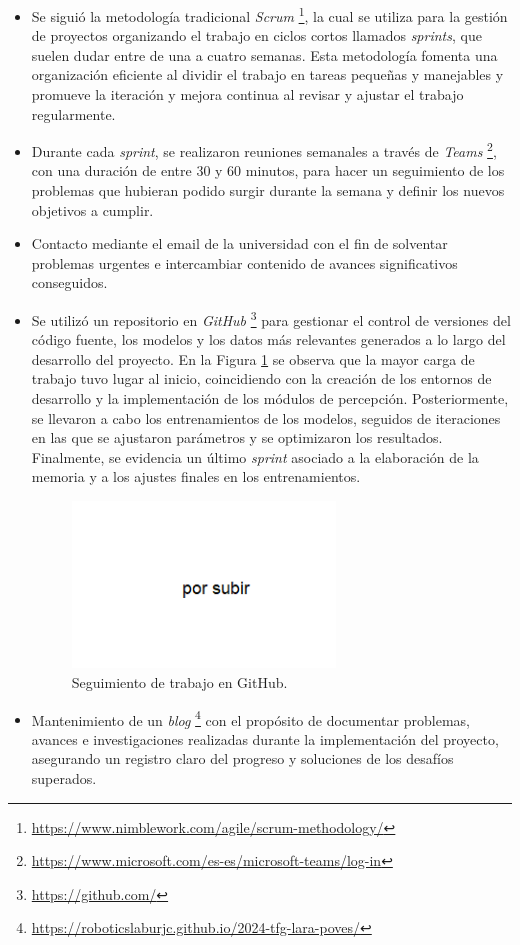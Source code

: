 \begin{itemize}
\item Se siguió la metodología tradicional \textit{Scrum} \footnote{\url{https://www.nimblework.com/agile/scrum-methodology/}}, la cual se utiliza para la gestión de proyectos organizando el trabajo en ciclos cortos llamados \textit{sprints}, que suelen dudar entre de una a cuatro semanas. Esta metodología fomenta una organización eficiente al dividir el trabajo en tareas pequeñas y manejables y promueve la iteración y mejora continua al revisar y ajustar el trabajo regularmente.
\item Durante cada \textit{sprint}, se realizaron reuniones semanales a través de \textit{Teams} \footnote{\url{https://www.microsoft.com/es-es/microsoft-teams/log-in}}, con una duración de entre 30 y 60 minutos, para hacer un seguimiento de los problemas que hubieran podido surgir durante la semana y definir los nuevos objetivos a cumplir.
\item Contacto mediante el email de la universidad con el fin de solventar problemas urgentes e intercambiar contenido de avances significativos conseguidos.
\item Se utilizó un repositorio en \textit{GitHub} \footnote{\url{https://github.com/}} para gestionar el control de versiones del código fuente, los modelos y los datos más relevantes generados a lo largo del desarrollo del proyecto. En la Figura \ref{fig:github} se observa que la mayor carga de trabajo tuvo lugar al inicio, coincidiendo con la creación de los entornos de desarrollo y la implementación de los módulos de percepción. Posteriormente, se llevaron a cabo los entrenamientos de los modelos, seguidos de iteraciones en las que se ajustaron parámetros y se optimizaron los resultados. Finalmente, se evidencia un último \textit{sprint} asociado a la elaboración de la memoria y a los ajustes finales en los entrenamientos.

\begin{figure}[ht]
  \centering
  \includegraphics[width=7cm]{figs/objetivos/github.png}
  \caption{Seguimiento de trabajo en GitHub.}
  \label{fig:github}
\end{figure}


\item Mantenimiento de un \textit{blog} \footnote{\url{https://roboticslaburjc.github.io/2024-tfg-lara-poves/}} con el propósito de documentar problemas, avances e investigaciones realizadas durante la implementación del proyecto, asegurando un registro claro del progreso y soluciones de los desafíos superados.


\end{itemize}

